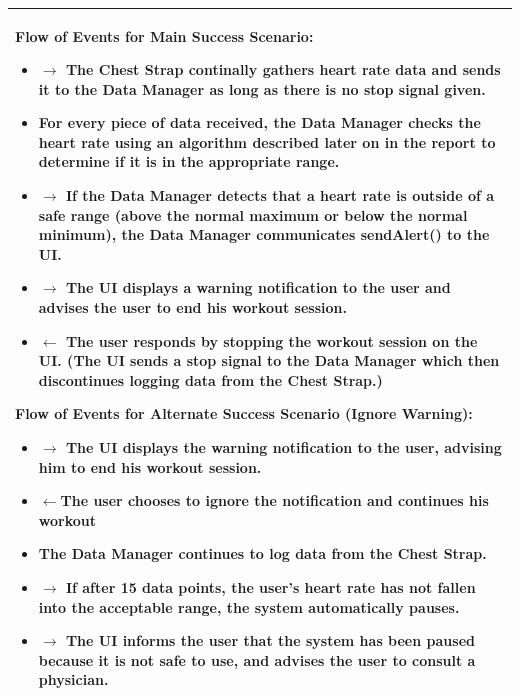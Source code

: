 \documentclass[letterpaper,english, 12pt]{scrreprt}
\begin{document}
\begin{center}
        \begin{longtable}{|C{15cm}|}
                \hline
                        \begin{flushleft}
                                \textbf{Flow of Events for Main Success Scenario: }
                        \end{flushleft}
                                \begin{itemize}
                                        \item $\rightarrow$ The Chest Strap continally gathers heart rate data and sends it to the Data Manager as long as there is no stop signal given.
                                        \item For every piece of data received, the Data Manager checks the heart rate using an algorithm described later on in the report to determine if it is in the appropriate range.
                                        \item $\rightarrow$ If the Data Manager detects that a heart rate is outside of a safe range (above the normal maximum or below the normal minimum), the Data Manager communicates sendAlert() to the UI.
                                        \item $\rightarrow$ The UI displays a warning notification to the user and advises the user to end his workout session.
										\item $\leftarrow$ The user responds by stopping the workout session on the UI. (The UI sends a stop signal to the Data Manager which then discontinues logging data from the Chest Strap.)
                               \end{itemize}
                        \begin{flushleft}
                                \textbf{Flow of Events for Alternate Success Scenario (Ignore Warning): }
                        \end{flushleft}
                                \begin{itemize}
                                        \item $\rightarrow$ The UI displays the warning notification to the user, advising him to end his workout session.
                                        \item $\leftarrow$The user chooses to ignore the notification and continues his workout
                                        \item The Data Manager continues to log data from the Chest Strap.
										\item $\rightarrow$ If after 15 data points, the user's heart rate has not fallen into the acceptable range, the system automatically pauses.
										\item $\rightarrow$ The UI informs the user that the system has been paused because it is not safe to use, and advises the user to consult a physician.	
                                \end{itemize}
                                \\
                \hline
        \end{longtable}
\end{center}
\end{document}
